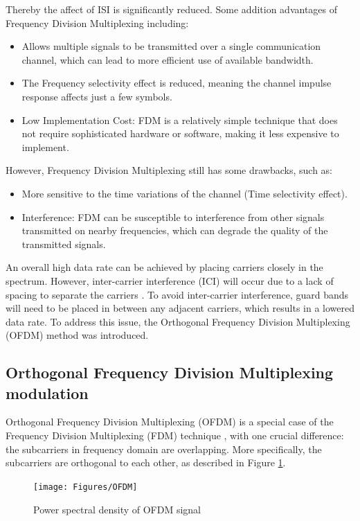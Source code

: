 Thereby the affect of ISI is significantly reduced. Some addition advantages of Frequency Division Multiplexing including:
\begin{itemize}
    \item Allows multiple signals to be transmitted over a single communication channel, which can lead to more efficient use of available bandwidth.
    \item The Frequency selectivity effect is reduced, meaning the channel impulse response affects just a few symbols.
    \item Low Implementation Cost: FDM is a relatively simple technique that does not require sophisticated hardware or software, making it less expensive to implement.
\end{itemize}
However, Frequency Division Multiplexing still has some drawbacks, such as: 
\begin{itemize}
    \item More sensitive to the time variations of the channel (Time selectivity effect).
    \item Interference: FDM can be susceptible to interference from other signals transmitted on nearby frequencies, which can degrade the quality of the transmitted signals.
\end{itemize}

An overall high data rate can be achieved by placing carriers closely in the spectrum. However, inter-carrier interference (ICI) will occur due to a lack of spacing to separate the carriers \cite{ICI}. To avoid inter-carrier interference, guard bands will need to be placed in between any adjacent carriers, which results in a lowered data rate. To address this issue, the Orthogonal Frequency Division Multiplexing (OFDM) method was introduced.

\subsection{Orthogonal Frequency Division Multiplexing modulation}
Orthogonal Frequency Division Multiplexing (OFDM) is a special case of the Frequency Division Multiplexing (FDM) technique \cite{OFDM2010}, with one crucial difference: the subcarriers in frequency domain are overlapping. More specifically, the subcarriers are orthogonal to each other, as described in Figure \ref{fig:OFDM}.

\begin{figure}[htbp]
    \centering
    \texttt{[image: Figures/OFDM]}
    \caption{Power spectral density of OFDM signal}
    \label{fig:OFDM}
\end{figure}

